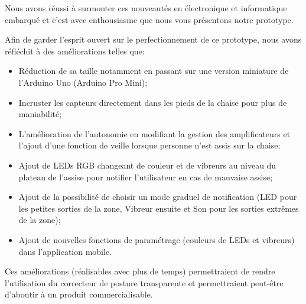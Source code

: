 \documentclass{polytech/polytech}
\begin{document}
Nous avons réussi à surmonter ces nouveautés en électronique et informatique embarqué et c'est avec enthousiasme que nous vous présentons notre prototype.

Afin de garder l'esprit ouvert sur le perfectionnement de ce prototype, nous avons réfléchit à des améliorations telles que:


\begin{itemize}
\item Réduction de sa taille notamment en passant sur une version miniature de l'Arduino Uno (Arduino Pro Mini);
\item Incruster les capteurs directement dans les pieds de la chaise pour plus de maniabilité;
\item L'amélioration de l'autonomie en modifiant la gestion des amplificateurs et l'ajout d'une fonction de veille lorsque personne n'est assis sur la chaise;
\item Ajout de LEDs RGB changeant de couleur et de vibreurs au niveau du plateau de l'assise pour notifier l'utilisateur en cas de mauvaise assise;
\item Ajout de la possibilité de choisir un mode graduel de notification (LED pour les petites sorties de la zone, Vibreur ensuite et Son pour les sorties extrêmes de la zone);
\item Ajout de nouvelles fonctions de paramétrage (couleurs de LEDs et vibreurs) dans l'application mobile.
\end{itemize}

Ces améliorations (réalisables avec plus de temps) permettraient de rendre l'utilisation du correcteur de posture transparente et permettraient peut-être d'aboutir à un produit commercialisable.



\end{document}
